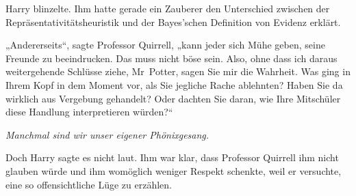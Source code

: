Harry blinzelte. Ihm hatte gerade ein Zauberer den Unterschied zwischen der Repräsentativitätsheuristik und der Bayes’schen Definition von Evidenz erklärt.

„Andererseits“, sagte Professor Quirrell, „kann jeder sich Mühe geben, seine Freunde zu beeindrucken. Das muss nicht böse sein. Also, ohne dass ich daraus weitergehende Schlüsse ziehe, Mr~Potter, sagen Sie mir die Wahrheit. Was ging in Ihrem Kopf in dem Moment vor, als Sie jegliche Rache ablehnten? Haben Sie da wirklich aus Vergebung gehandelt? Oder dachten Sie daran, wie Ihre Mitschüler diese Handlung interpretieren würden?“

\emph{Manchmal sind wir unser eigener Phönixgesang.}

Doch Harry sagte es nicht laut. Ihm war klar, dass Professor Quirrell ihm nicht glauben würde und ihm womöglich weniger Respekt schenkte, weil er versuchte, eine so offensichtliche Lüge zu erzählen.

